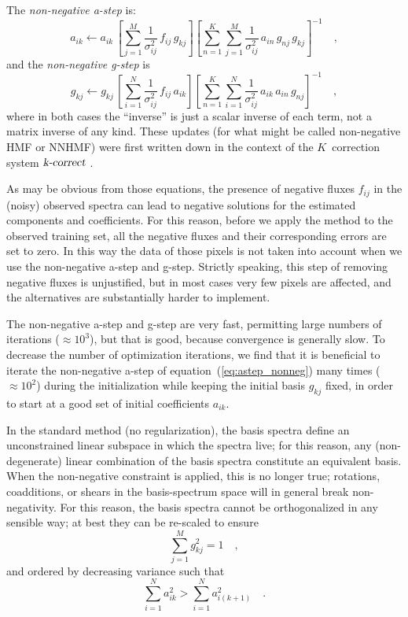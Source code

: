 \documentclass[12pt,preprint]{aastex}
\newcommand{\equationname}{equation}
\begin{document}
The \emph{non-negative a-step} is:
\begin{equation}\label{eq:astep_nonneg}
a_{ik} \gets a_{ik}\,\left[\sum_{j=1}^{M}\frac{1}{\sigma^2_{ij}}\,f_{ij}\,g_{kj}\right]\left[\sum_{n=1}^{K}\sum_{j=1}^{M}\frac{1}{\sigma^2_{ij}}\,a_{in}\,g_{nj}\,g_{kj}\right]^{-1}
\quad ,
\end{equation}
and the \emph{non-negative g-step} is
\begin{equation}\label{eq:gstep_nonneg}
g_{kj} \gets g_{kj}\,\left[\sum_{i=1}^{N}\frac{1}{\sigma^2_{ij}}\,f_{ij}\,a_{ik}\right]\left[\sum_{n=1}^{K}\sum_{i=1}^{N}\frac{1}{\sigma^2_{ij}}\,a_{ik}\,a_{in}\,g_{nj}\right]^{-1}
\quad ,
\end{equation}
where in both cases the ``inverse'' is just a scalar inverse of each
term, not a matrix inverse of any kind.  These updates (for what might
be called non-negative HMF or NNHMF) were first written down in the
context of the $K$~correction system $\textsl{k-correct}$
\citep{blanton}.

As may be obvious from those equations, the presence of negative
fluxes $f_{ij}$ in the (noisy) observed spectra can lead to negative
solutions for the estimated components and coefficients. For this
reason, before we apply the method to the observed training set, all
the negative fluxes and their corresponding errors are set to zero. In
this way the data of those pixels is not taken into account when we
use the non-negative a-step and g-step.  Strictly speaking, this step
of removing negative fluxes is unjustified, but in most cases very few
pixels are affected, and the alternatives are substantially harder to
implement.

The non-negative a-step and g-step are very fast, permitting large
numbers of iterations ($\approx 10^3$), but that is good, because
convergence is generally slow.  To decrease the number of optimization
iterations, we find that it is beneficial to iterate the non-negative
a-step of \equationname~(\ref{eq:astep_nonneg}) many times ($\approx
10^2$) during the initialization while keeping the initial basis
$g_{kj}$ fixed, in order to start at a good set of initial
coefficients $a_{ik}$.

In the standard method (no regularization), the basis spectra define
an unconstrained linear subspace in which the spectra live; for this
reason, any (non-degenerate) linear combination of the basis spectra
constitute an equivalent basis.  When the non-negative constraint is
applied, this is no longer true; rotations, coadditions, or shears in
the basis-spectrum space will in general break non-negativity.  For
this reason, the basis spectra cannot be orthogonalized in any
sensible way; at best they can be re-scaled to ensure
\begin{equation}\label{eq:nnnormalization}
\sum_{j=1}^{M}g_{kj}^2 = 1
\quad ,
\end{equation}
and ordered by decreasing variance such that
\begin{equation}\label{eq:nnordering}
\sum_{i=1}^{N}a_{ik}^2>\sum_{i=1}^{N}a_{i(k+1)}^2
\quad .
\end{equation}
\end{document}
